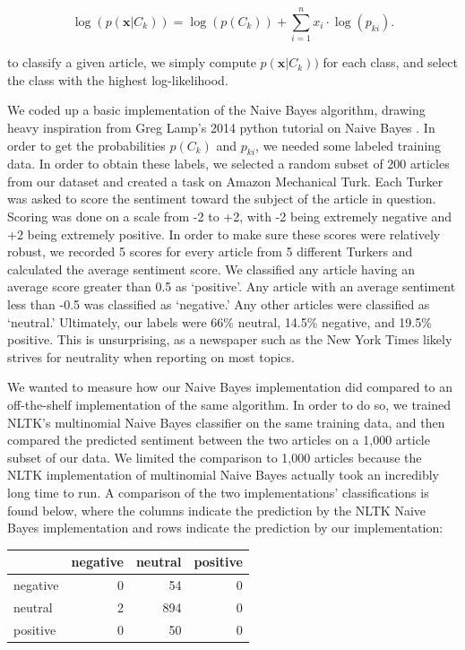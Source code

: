 \documentclass[fleqn,12pt]{SelfArx} %
\begin{document}
\begin{equation}
\log(p(\mathbf{x}|C_k)) = \log ( p(C_k)) + \sum_{i=1}^n x_i \cdot \log(p_{ki}).
\end{equation}

\noindent to classify a given article, we simply compute $p(\mathbf{x}|C_k))$ for each class, and select the class with the highest log-likelihood.

We coded up a basic implementation of the Naive Bayes algorithm, drawing heavy inspiration from Greg Lamp's 2014 python tutorial on Naive Bayes \cite{NaiveBayes}. In order to get the probabilities $p(C_k)$ and $p_{ki}$, we needed some labeled training data. In order to obtain these labels, we selected a random subset of 200 articles from our dataset and created a task on Amazon Mechanical Turk. Each Turker was asked to score the sentiment toward the subject of the article in question. Scoring was done on a scale from -2 to +2, with -2 being extremely negative and +2 being extremely positive. In order to make sure these scores were relatively robust, we recorded 5 scores for every article from 5 different Turkers and calculated the average sentiment score. We classified any article having an average score greater than 0.5 as `positive'. Any article with an average sentiment less than -0.5 was classified as `negative.' Any other articles were classified as `neutral.' Ultimately, our labels were 66\% neutral, 14.5\% negative, and 19.5\% positive. This is unsurprising, as a newspaper such as the New York Times likely strives for neutrality when reporting on most topics.

We wanted to measure how our Naive Bayes implementation did compared to an off-the-shelf implementation of the same algorithm. In order to do so, we trained NLTK's multinomial Naive Bayes classifier \cite{BirdKleinLoper09} on the same training data, and then compared the predicted sentiment between the two articles on a 1,000 article subset of our data. We limited the comparison to 1,000 articles because the NLTK implementation of multinomial Naive Bayes actually took an incredibly long time to run. A comparison of the two implementations' classifications is found below, where the columns indicate the prediction by the NLTK Naive Bayes implementation and rows indicate the prediction by our implementation:

\vspace{10 mm}

\begin{tabular}{l | r r r}
\toprule
  & negative & neutral & positive\\
\midrule
negative & 0 & 54 & 0\\
neutral & 2 & 894 & 0\\
positive & 0 & 50 & 0\\
\bottomrule
\end{tabular}
\end{document}
